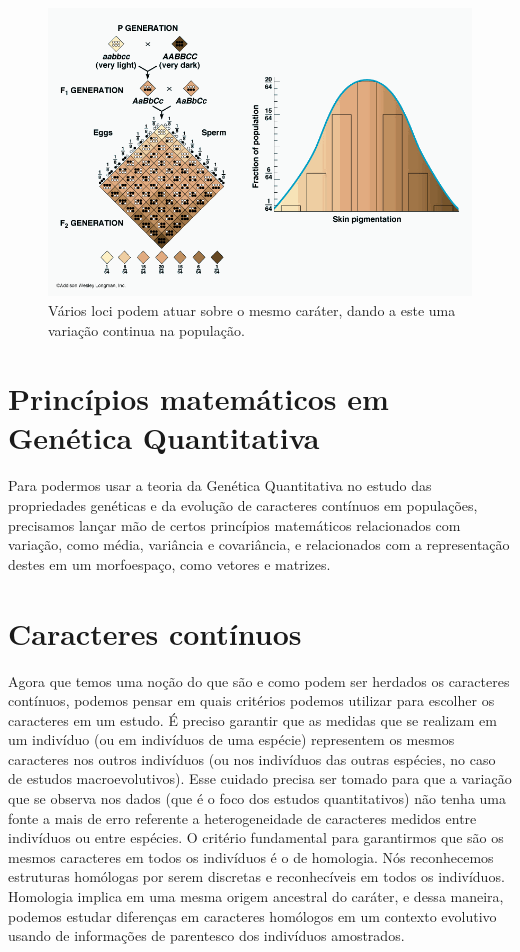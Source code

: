 \documentclass[portuges,]{tufte-handout}
\begin{document}
\begin{figure}
  \includegraphics{./figuras/variosalelos.png}
  \caption{Vários loci podem atuar sobre o mesmo caráter, dando a
      este uma variação continua na população.}
  \label{variosloci}
\end{figure}

\section{Princípios matemáticos em Genética
Quantitativa}\label{princuxedpios-matemuxe1ticos-em-genuxe9tica-quantitativa}

Para podermos usar a teoria da Genética Quantitativa no estudo das
propriedades genéticas e da evolução de caracteres contínuos em
populações, precisamos lançar mão de certos princípios matemáticos
relacionados com variação, como média, variância e covariância, e
relacionados com a representação destes em um morfoespaço, como vetores
e matrizes.

\section{Caracteres contínuos}\label{caracteres-contuxednuos}

Agora que temos uma noção do que são e como podem ser herdados os
caracteres contínuos, podemos pensar em quais critérios podemos utilizar
para escolher os caracteres em um estudo. É preciso garantir que as
medidas que se realizam em um indivíduo (ou em indivíduos de uma
espécie) representem os mesmos caracteres nos outros indivíduos (ou nos
indivíduos das outras espécies, no caso de estudos macroevolutivos).
Esse cuidado precisa ser tomado para que a variação que se observa nos
dados (que é o foco dos estudos quantitativos) não tenha uma fonte a
mais de erro referente a heterogeneidade de caracteres medidos entre
indivíduos ou entre espécies. O critério fundamental para garantirmos
que são os mesmos caracteres em todos os indivíduos é o de homologia.
Nós reconhecemos estruturas homólogas por serem discretas e
reconhecíveis em todos os indivíduos. Homologia implica em uma mesma
origem ancestral do caráter, e dessa maneira, podemos estudar diferenças
em caracteres homólogos em um contexto evolutivo usando de informações
de parentesco dos indivíduos amostrados.
\end{document}
